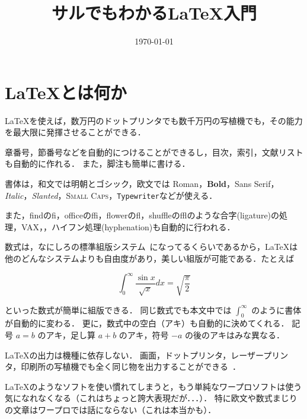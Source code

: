 \documentclass[a4j]{jarticle}
\begin{document}
\title{サルでもわかる\LaTeX 入門}
\author{}
\date{\today}

\maketitle

\section{\LaTeX とは何か}

 \LaTeX を使えば，数万円のドットプリンタでも数千万円の写植機でも，その能力を最大限に発揮させることができる．

章番号，節番号などを自動的につけることができるし，目次，索引，文献リストも自動的に作れる．
また，脚注も簡単に書ける．

書体は，和文では明朝とゴシック，欧文では Roman，\textbf{Bold}，\textsf{Sans Serif}，\textit{Italic}，\textsl{Slanted}，\textsc{Small Caps}，\texttt{Typewriter}などが使える．

\vspace{15mm}

また，findのfi，officeのffi，flowerのfl，shuffleのfflのような合字(ligature)の処理，VAX，，ハイフン処理(hyphenation)も自動的に行われる．

数式は，なにしろの標準組版システム~\cite{Rate06}になってるくらいであるから，\LaTeX は他のどんなシステムよりも自由度があり，美しい組版が可能である．たとえば

  \[ \int_0^\infty \frac{\sin x}{\sqrt{x}}dx
    = \sqrt{\frac{\pi}{2}} \]

といった数式が簡単に組版できる．
\hspace{30mm}同じ数式でも本文中では $\int_0^\infty$ のように書体が自動的に変わる．
更に，数式中の空白（アキ）も自動的に決めてくれる．
記号 $a=b$ のアキ，足し算 $a+b$ のアキ，符号 $-a$ の後のアキはみな異なる．

\begin{shadebox}
\LaTeX の出力は機種に依存しない．
画面，ドットプリンタ，レーザープリンタ，印刷所の写植機でも全く同じ物を出力することができる~\cite{HM99}．
\end{shadebox}

\LaTeX のようなソフトを使い慣れてしまうと，もう単純なワープロソフトは使う気になれなくなる（これはちょっと誇大表現だが．．．）．
特に欧文や数式まじりの文章はワープロでは話にならない（これは本当かも）．
\end{document}
